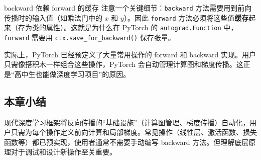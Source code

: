 \begin{warningbox}{backward 依赖 forward 的缓存}
注意一个关键细节：\texttt{backward} 方法需要用到前向传播时的输入值（如乘法门中的 $x$ 和 $y$）。因此 \texttt{forward} 方法必须将这些值\textbf{缓存}起来（存为类的属性）。这就是为什么在 PyTorch 的 \texttt{autograd.Function} 中，\texttt{forward} 需要用 \texttt{ctx.save\_for\_backward()} 保存张量。
\end{warningbox}

实际上，PyTorch 已经预定义了大量常用操作的 forward 和 backward 实现。用户只需像搭积木一样组合这些操作，PyTorch 会自动管理计算图和梯度传播。这正是``高中生也能做深度学习项目''的原因。

\subsection{本章小结}

现代深度学习框架将反向传播的``基础设施''（计算图管理、梯度传播）自动化，用户只需为每个操作定义前向计算和局部梯度。常见操作（线性层、激活函数、损失函数等）都已预实现，使用者通常不需要手动编写 backward 方法。但理解底层原理对于调试和设计新操作至关重要。


